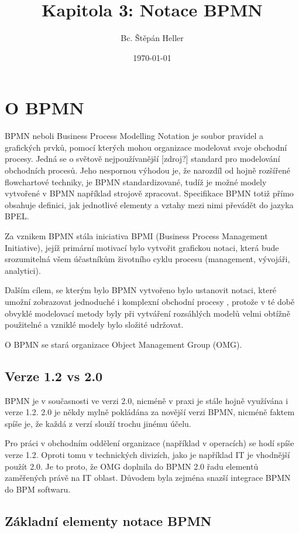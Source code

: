 \documentclass[]{article}
\begin{document}
\title{Kapitola 3: Notace BPMN}
\author{Bc. Štěpán Heller}
\date{\today}
\maketitle

\section{O BPMN}
BPMN neboli Business Process Modelling Notation je soubor pravidel a grafických prvků, pomocí kterých mohou organizace modelovat svoje obchodní procesy. Jedná se o světově nejpoužívanější [zdroj?] standard pro modelování obchodních procesů. Jeho nespornou výhodou je, že narozdíl od hojně rozšířené flowchartové techniky, je BPMN standardizované, tudíž je možné modely vytvořené v BPMN například strojově zpracovat. Specifikace BPMN totiž přímo obsahuje definici, jak jednotlivé elementy a vztahy mezi nimi převádět do jazyka BPEL.

Za vznikem BPMN stála iniciativa BPMI (Business Process Management Initiative), jejíž primární motivací bylo vytvořit grafickou notaci, která bude srozumitelná všem účastníkům životního cyklu procesu (management, vývojáři, analytici). \cite{Vasicek2008} 

Dalším cílem, se kterým bylo BPMN vytvořeno bylo ustanovit notaci, které umožní zobrazovat jednoduché i komplexní obchodní procesy \cite{Vasicek2008}, protože v té době obvyklé modelovací metody byly při vytváření rozsáhlých modelů velmi obtížně použitelné a vzniklé modely bylo složité udržovat.

O BPMN se stará organizace Object Management Group (OMG).

\subsection{Verze 1.2 vs 2.0}
BPMN je v současnosti ve verzi 2.0, nicméně v praxi je stále hojně využívána i verze 1.2. 2.0 je někdy mylně pokládána za novější verzi BPMN, nicméně faktem spíše je, že každá z verzí slouží trochu jinému účelu.

Pro práci v obchodním oddělení organizace (například v operacích) se hodí spíše verze 1.2. Oproti tomu v technických divizích, jako je například IT je vhodnější použít 2.0. Je to proto, že OMG doplnila do BPMN 2.0 řadu elementů zaměřených právě na IT oblast. \cite{Panagacos2012} Důvodem byla zejména snazší integrace BPMN do BPM softwaru.

\subsection{Základní elementy notace BPMN}
\end{document}
